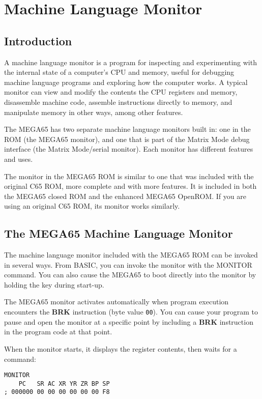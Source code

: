 \chapter{Machine Language Monitor}
\label{cha:MLMonitor}
\section{Introduction}

A machine language monitor is a program for inspecting and experimenting with the internal state of a computer's CPU and memory, useful for debugging machine language programs and exploring how the computer works. A typical monitor can view and modify the contents the CPU registers and memory, disassemble machine code, assemble instructions directly to memory, and manipulate memory in other ways, among other features.

The MEGA65 has two separate machine language monitors built in: one in the ROM (the MEGA65 monitor), and one that is part of the Matrix Mode debug interface (the Matrix Mode/serial monitor). Each monitor has different features and uses.

The monitor in the MEGA65 ROM is similar to one that was included with the original C65 ROM, more complete and with more features. It is included in both the MEGA65 closed ROM and the enhanced MEGA65 OpenROM. If you are using an original C65 ROM, its monitor works similarly.


\section{The MEGA65 Machine Language Monitor}

The machine language monitor included with the MEGA65 ROM can be invoked in several ways. From BASIC, you can invoke the monitor with the {\screentext MONITOR} command. You can also cause the MEGA65 to boot directly into the monitor by holding the  key during start-up.

The MEGA65 monitor activates automatically when program execution encounters the {\bf BRK} instruction (byte value {\tt 00}). You can cause your program to pause and open the monitor at a specific point by including a {\bf BRK} instruction in the program code at that point.

When the monitor starts, it displays the register contents, then waits for a command:

\begin{tcolorbox}[colback=blue,coltext=white]
\verbatimfont{\codefont}
\begin{verbatim}
MONITOR
    PC   SR AC XR YR ZR BP SP
; 000000 00 00 00 00 00 00 F8
\end{verbatim}
\end{tcolorbox}

